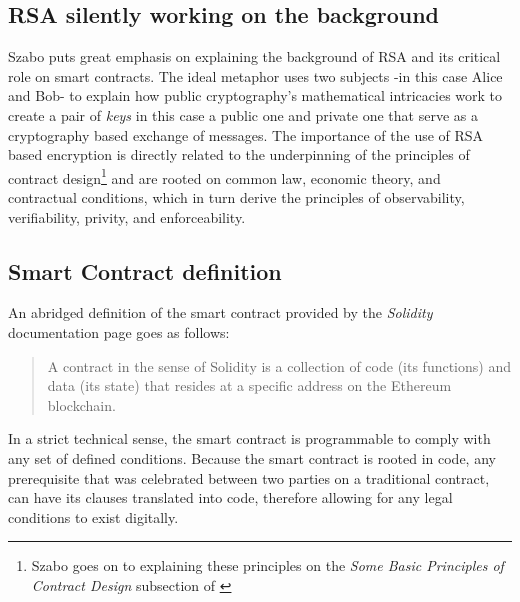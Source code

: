 \documentclass[submission,copyright,creativecommons]{eptcs}
\begin{document}
\subsection{RSA silently working on the background}
Szabo puts great emphasis on explaining the background of RSA\cite{milanov2009rsa} and its critical role on smart contracts.  The ideal metaphor uses two subjects -in this case Alice and Bob- to explain how public cryptography's mathematical intricacies work to create a pair of \textit{keys} in this case a public one and private one that serve as a cryptography based exchange of messages.  The importance of the use of RSA based encryption is directly related to the underpinning of the principles of contract design\footnote{Szabo goes on to explaining these principles on the \textit{Some Basic Principles of Contract Design} subsection of \cite{NickSzaboSmart}} and are rooted on common law, economic theory, and contractual conditions, which in turn derive the principles of observability, verifiability, privity, and enforceability.



\subsection{Smart Contract definition}
An abridged definition of the smart contract provided by the \textit{Solidity} documentation page goes as follows:
\begin{quote}
    A contract in the sense of Solidity is a collection of code (its functions) and data (its state) that resides at a specific address on the Ethereum blockchain.\cite{IntroductionSmartContracts}
\end{quote}
In a strict technical sense, the smart contract is programmable to comply with any set of defined conditions.  Because the smart contract is rooted in code, any prerequisite that was celebrated between two parties on a traditional contract, can have its clauses translated into code, therefore allowing for any legal conditions to exist digitally.
\end{document}

